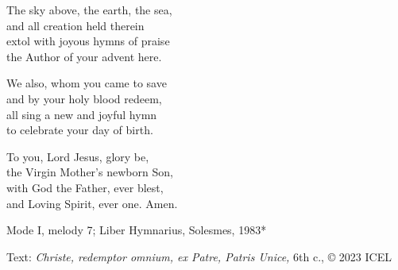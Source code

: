 \hymn



\begin{underhymnverse}
The sky above, the earth, the sea,\\
and all creation held therein\\
extol with joyous hymns of praise\\
the Author of your advent here.

We also, whom you came to save\\
and by your holy blood redeem,\\
all sing a new and joyful hymn\\
to celebrate your day of birth.

To you, Lord Jesus, glory be,\\
the Virgin Mother’s newborn Son,\\
with God the Father, ever blest,\\
and Loving Spirit, ever one. Amen.
\end{underhymnverse}


\begin{hymnsource}
Mode I, melody 7; Liber Hymnarius, Solesmes, 1983*

Text: \emph{Christe, redemptor omnium, ex Patre, Patris Unice,} 6th c., © 2023 ICEL
\end{hymnsource}
